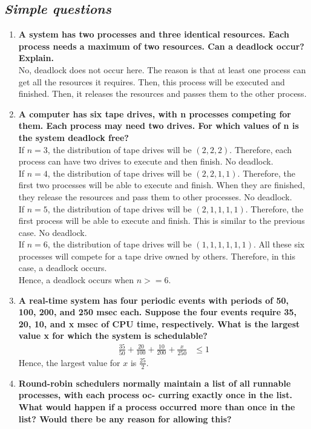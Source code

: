 \documentclass{article}
\begin{document}
\begin{spacing}{1.5}
\section{\textit{Simple questions}}
\begin{enumerate}
	\item\textbf{A system has two processes and three identical resources. Each process needs a maximum of two resources. Can a deadlock occur? Explain.}\\
	No, deadlock does not occur here. The reason is that at least one process can get all the resources it requires. Then, this process will be executed and finished. Then, it releases the resources and passes them to the other process.
	\item\textbf{A computer has six tape drives, with n processes competing for them. Each process may need two drives. For which values of n is the system deadlock free?}\\
	If $n=3$, the distribution of tape drives will be $(2,2,2)$. Therefore, each process can have two drives to execute and then finish. No deadlock.\\
	If $n=4$, the distribution of tape drives will be $(2,2,1,1)$. Therefore, the first two processes will be able to execute and finish. When they are finished, they release the resources and pass them to other processes. No deadlock.\\
	If $n=5$, the distribution of tape drives will be $(2,1,1,1,1)$. Therefore, the first process will be able to execute and finish. This is similar to the previous case. No deadlock.\\
	If $n=6$, the distribution of tape drives will be $(1,1,1,1,1,1)$. All these six processes will compete for a tape drive owned by others. Therefore, in this case, a deadlock occurs.\\
	Hence, a deadlock occurs when $n>=6$.
	\item\textbf{A real-time system has four periodic events with periods of 50, 100, 200, and 250 msec each. Suppose the four events require 35, 20, 10, and x msec of CPU time, respectively. What is the largest value x for which the system is schedulable?}
	\begin{align}
	\frac{35}{50}+\frac{20}{100}+\frac{10}{200}+\frac{x}{250}&\leqslant1
	\end{align}
	Hence, the largest value for $x$ is $\frac{25}{2}$.
	\item\textbf{Round-robin schedulers normally maintain a list of all runnable processes, with each process oc- curring exactly once in the list. What would happen if a process occurred more than once in the list? Would there be any reason for allowing this?}\\


\end{enumerate}
\end{spacing}
\end{document}
